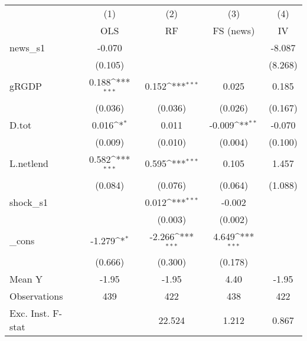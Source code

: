 {
\def\sym#1{\ifmmode^{#1}\else\(^{#1}\)\fi}
\begin{tabular}{l*{4}{c}}
\toprule
            &\multicolumn{1}{c}{(1)}&\multicolumn{1}{c}{(2)}&\multicolumn{1}{c}{(3)}&\multicolumn{1}{c}{(4)}\\
            &\multicolumn{1}{c}{OLS}&\multicolumn{1}{c}{RF}&\multicolumn{1}{c}{FS (news)}&\multicolumn{1}{c}{IV}\\
\midrule
news\_s1     &      -0.070         &                     &                     &      -8.087         \\
            &     (0.105)         &                     &                     &     (8.268)         \\
\addlinespace
gRGDP       &       0.188\sym{***}&       0.152\sym{***}&       0.025         &       0.185         \\
            &     (0.036)         &     (0.036)         &     (0.026)         &     (0.167)         \\
\addlinespace
D.tot       &       0.016\sym{*}  &       0.011         &      -0.009\sym{**} &      -0.070         \\
            &     (0.009)         &     (0.010)         &     (0.004)         &     (0.100)         \\
\addlinespace
L.netlend   &       0.582\sym{***}&       0.595\sym{***}&       0.105         &       1.457         \\
            &     (0.084)         &     (0.076)         &     (0.064)         &     (1.088)         \\
\addlinespace
shock\_s1    &                     &       0.012\sym{***}&      -0.002         &                     \\
            &                     &     (0.003)         &     (0.002)         &                     \\
\addlinespace
\_cons      &      -1.279\sym{*}  &      -2.266\sym{***}&       4.649\sym{***}&                     \\
            &     (0.666)         &     (0.300)         &     (0.178)         &                     \\
\midrule
Mean Y      &       -1.95         &       -1.95         &        4.40         &       -1.95         \\
Observations&         439         &         422         &         438         &         422         \\
Exc. Inst. F-stat&                     &      22.524         &       1.212         &       0.867         \\
\bottomrule
\end{tabular}
}
